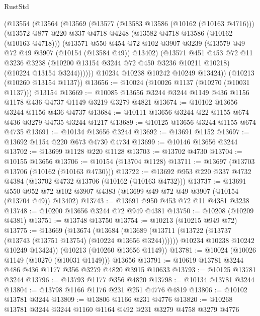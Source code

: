 \begin{lexlean}{RustStd}
\begin{coremodule}
    (@13554
      (@13564
        (@13569
          (@13577
            (@13583 @13586 (@10162 (@10163 @4716)))
            (@13572
              @877
              @220
              @337
              @4718
              @4248
              (@13582 @4718 @13586 (@10162 (@10163 @4718)))
              (@13571
                @550
                @454
                @72
                @102
                @3907
                @3239
                (@13579 @49 @72 @49 @3907 (@10154 (@13584 @49)) @13402)
                (@13571
                  @451
                  @453
                  @72
                  @11
                  @3236
                  @3238
                  (@10200 @13154 @3244 @72 @450 @3236 @10211 @10218)
                  (@10224 @13154 @3244))))))
        @10234
        @10238
        @10242
        @10249
        @13424))
    (@10213 (@10260 @13154 @1137))
@13656 := @10024 (@10026 @1137 (@10270 (@10031 @1137))) @13154
@13669 := @10085 @13656 @3244 @3244 @1149 @436 @1156 @1178 @436 @4737 @1149 @3219 @3279 @4821
@13674 := @10102 @13656 @3244 @1156 @436 @4737
@13684 := @10111 @13656 @3244 @22 @1155 @674 @436 @3279 @4735 @3244 @1217
@13689 := @10125 @13656 @3244 @1155 @674 @4735
@13691 := @10134 @13656 @3244
@13692 := @13691 @1152
@13697 := @13692 @1154 @220 @673 @4730 @4734
@13699 := @10146 @13656 @3244
@13702 := @13699 @1128 @220 @1128
@13703 := @13702 @4730
@13704 := @10155 @13656
@13706 := @10154 (@13704 @1128)
@13711 := @13697 (@13703 @13706 (@10162 (@10163 @4730)))
@13722 := @13692 @953 @220 @337 @4732 @4384 (@13702 @4732 @13706 (@10162 (@10163 @4732)))
@13737 := @13691
    @550
    @952
    @72
    @102
    @3907
    @4383
    (@13699 @49 @72 @49 @3907 (@10154 (@13704 @49)) @13402)
@13743 := @13691 @950 @453 @72 @11 @4381 @3238
@13748 := @10200 @13656 @3244 @72 @949 @4381
@13750 := @10208 (@10209 @4381)
@13751 := @13748 @13750
@13754 := @10213 (@10215 @949 @72)
@13775 := @13669
    (@13674
      (@13684
        (@13689 (@13711 (@13722 (@13737 (@13743 (@13751 @13754) (@10224 @13656 @3244))))))
        @10234
        @10238
        @10242
        @10249
        @13424))
    (@10213 (@10260 @13656 @1149))
@13781 := @10024 (@10026 @1149 (@10270 (@10031 @1149))) @13656
@13791 := @10619 @13781 @3244 @486 @436 @1177 @356 @3279 @4820 @3915 @10633
@13793 := @10125 @13781 @3244
@13796 := @13793 @1177 @356 @4820
@13798 := @10134 @13781 @3244
@13804 := @13798 @1166 @1176 @231 @251 @4776 @4819
@13806 := @10102 @13781 @3244
@13809 := @13806 @1166 @231 @4776
@13820 := @10268 @13781 @3244 @3244 @1160 @1164 @492 @231 @3279 @4758 @3279 @4776

\end{coremodule}
\end{lexlean}
